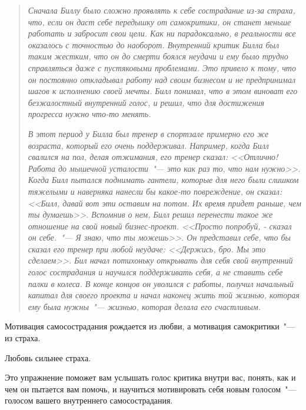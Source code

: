 \begin{quotation}
	\textit{Сначала Биллу было сложно проявлять к себе сострадание из-за страха, что, если он даст себе передышку от самокритики, он станет меньше работать и забросит свои цели. Как ни парадоксально, в реальности все оказалось с точностью до наоборот. Внутренний критик Билла был таким жестким, что он до смерти боялся неудачи и ему было трудно справляться даже с пустяковыми проблемами. Это привело к тому, что он постоянно откладывал работу над своим бизнесом и не предпринимал шагов к исполнению своей мечты. Билл понимал, что в этом виноват его безжалостный внутренний голос, и решил, что для достижения прогресса нужно что-то менять.}
	
	\textit{В этот период у Билла был тренер в спортзале примерно его же возраста, который его очень поддерживал. Например, когда Билл свалился на пол, делая отжимания, его тренер сказал: <<Отлично! Работа до мышечной усталости~"--- это как раз то, что нам нужно>>. Когда Билл пытался поднимать гантели, которые для него были слишком тяжелыми и наверняка нанесли бы какое-то повреждение, он сказал: <<Билл, давай вот эти оставим на потом. Их время придет раньше, чем ты думаешь>>. Вспомнив о нем, Билл решил перенести такое же отношение на свой новый бизнес-проект. <<Просто попробуй, - сказал он себе.~"--- Я знаю, что ты можешь>>. Он представил себе, что бы сказал его тренер при любой неудаче: <<Держись, бро. Мы это сделаем>>. Бил начал потихоньку открывать для себя свой внутренний голос сострадания и научился поддерживать себя, а не ставить себе палки в колеса. В конце концов он уволился с работы, получил начальный капитал для своего проекта и начал наконец жить той жизнью, которая ему была нужны~"--- жизнью, которая делала его счастливым.}
\end{quotation}

\vspace{4ex}

\begin{center}
	{\Large Мотивация самосострадания рождается из любви, а мотивация самокритики~"--- из страха.}
	
	\vspace{1ex}
	
	{\Large	Любовь сильнее страха.}
\end{center}

\newpage
{} \label{EX:Finding_Your_Compassionate_Voice}

Это упражнение поможет вам услышать голос критика внутри вас, понять, как и чем он пытается вам помочь, и научиться мотивировать себя новым голосом~"--- голосом вашего внутреннего самосострадания. 

